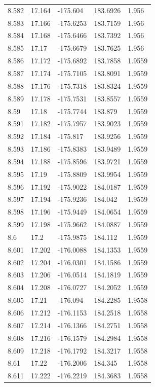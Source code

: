 \begin{tabular}{lllll}
8.582 & 17.164 & -175.604 & 183.6926 & 1.956 \\
8.583 & 17.166 & -175.6253 & 183.7159 & 1.956 \\
8.584 & 17.168 & -175.6466 & 183.7392 & 1.956 \\
8.585 & 17.17 & -175.6679 & 183.7625 & 1.956 \\
8.586 & 17.172 & -175.6892 & 183.7858 & 1.9559 \\
8.587 & 17.174 & -175.7105 & 183.8091 & 1.9559 \\
8.588 & 17.176 & -175.7318 & 183.8324 & 1.9559 \\
8.589 & 17.178 & -175.7531 & 183.8557 & 1.9559 \\
8.59 & 17.18 & -175.7744 & 183.879 & 1.9559 \\
8.591 & 17.182 & -175.7957 & 183.9023 & 1.9559 \\
8.592 & 17.184 & -175.817 & 183.9256 & 1.9559 \\
8.593 & 17.186 & -175.8383 & 183.9489 & 1.9559 \\
8.594 & 17.188 & -175.8596 & 183.9721 & 1.9559 \\
8.595 & 17.19 & -175.8809 & 183.9954 & 1.9559 \\
8.596 & 17.192 & -175.9022 & 184.0187 & 1.9559 \\
8.597 & 17.194 & -175.9236 & 184.042 & 1.9559 \\
8.598 & 17.196 & -175.9449 & 184.0654 & 1.9559 \\
8.599 & 17.198 & -175.9662 & 184.0887 & 1.9559 \\
8.6 & 17.2 & -175.9875 & 184.112 & 1.9559 \\
8.601 & 17.202 & -176.0088 & 184.1353 & 1.9559 \\
8.602 & 17.204 & -176.0301 & 184.1586 & 1.9559 \\
8.603 & 17.206 & -176.0514 & 184.1819 & 1.9559 \\
8.604 & 17.208 & -176.0727 & 184.2052 & 1.9559 \\
8.605 & 17.21 & -176.094 & 184.2285 & 1.9558 \\
8.606 & 17.212 & -176.1153 & 184.2518 & 1.9558 \\
8.607 & 17.214 & -176.1366 & 184.2751 & 1.9558 \\
8.608 & 17.216 & -176.1579 & 184.2984 & 1.9558 \\
8.609 & 17.218 & -176.1792 & 184.3217 & 1.9558 \\
8.61 & 17.22 & -176.2006 & 184.345 & 1.9558 \\
8.611 & 17.222 & -176.2219 & 184.3683 & 1.9558 \\

\end{tabular}
